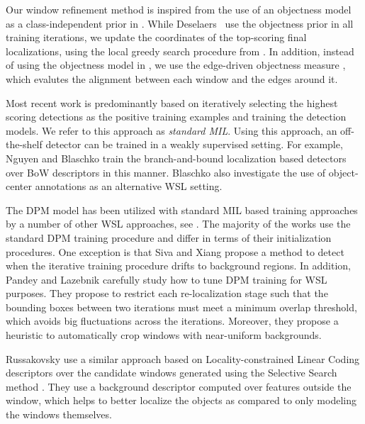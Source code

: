 \documentclass[10pt,journal,cspaper,final,twocolumn,compsoc]{./IEEEtran}
\begin{document}
Our window refinement method is inspired from the use of
an objectness model as a class-independent prior in
\cite{deselaers12ijcv}. While Deselaers~\etal\cite{deselaers12ijcv} use the objectness prior in all training iterations,
we update the coordinates of
the top-scoring final localizations, 
using the local greedy search procedure from
\cite{zitnick14eccv}.  In addition, instead of using the
objectness model in \cite{alexe12pami}, we use the
edge-driven objectness measure \cite{zitnick14eccv},
which evalutes the alignment between each window and 
the edges around it. 

Most recent work is predominantly based on iteratively 
selecting the highest scoring detections as the positive
training examples and training the detection models. 
We refer to this approach as {\em standard MIL}. 
Using this approach, an off-the-shelf detector can be trained
in a weakly supervised setting.
For example, Nguyen \etal\cite{nguyen09iccv} and
Blaschko \etal\cite{blaschko10nips} train the branch-and-bound
localization \cite{lampert09pami} based detectors over
BoW descriptors  in this manner. 
Blaschko \etal  also investigate 
the use of object-center annotations as an alternative WSL setting.

The DPM model \cite{felzenszalb10pami} has been utilized
with standard MIL based training approaches by a number of other WSL approaches, see \eg\cite{siva11iccv,siva12eccv,shi13iccv,siva13cvpr,pandey11iccv}.
The majority of the works use the standard DPM training
procedure and differ in terms of their initialization
procedures. One exception is that Siva and Xiang \cite{siva11iccv}
propose a method to detect when the iterative training
procedure drifts to background regions. In addition,
Pandey and Lazebnik \cite{pandey11iccv} carefully study how to tune DPM
training for WSL purposes. They propose
to restrict each re-localization stage such that the
bounding boxes between two iterations must meet a minimum
overlap threshold, which avoids big fluctuations across
the iterations. Moreover, they propose a heuristic to
automatically crop windows with near-uniform backgrounds.

Russakovsky \etal\cite{russakovsky12eccv} use a similar approach based on
Locality-constrained Linear Coding
descriptors \cite{wang10cvpr} over the candidate
windows generated using the Selective Search method 
\cite{uijlings13ijcv}.  
They use a background
descriptor computed over features outside the window,
which helps to better localize the objects as compared to
only modeling the windows themselves. 
\end{document}
